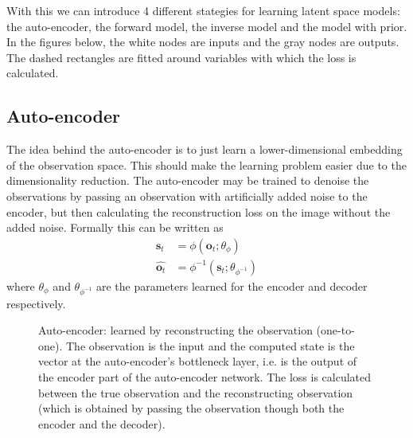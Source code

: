 With this we can introduce 4 different stategies for learning latent space models:
the auto-encoder, the forward model, the inverse model and the model
with prior.
In the figures below, the white nodes are inputs and the gray nodes are outputs.
The dashed rectangles are fitted around variables with which the loss is calculated.

\subsection{Auto-encoder}
The idea behind the auto-encoder is to just learn a lower-dimensional embedding
of the observation space. This should make the learning problem easier due to the
dimensionality reduction.
The auto-encoder may be trained to denoise the observations by passing an observation
with artificially added noise to the encoder, but then calculating the reconstruction
loss on the image without the added noise.
Formally this can be written as
\begin{align}
		\bm{s}_{t} &= \phi (\bm{o}_{t}; \theta_{ \phi }) \\
		\hat{\bm{o}_{t}} &= \phi^{ -1 } (\bm{s}_{t}; \theta_{ \phi^{ -1 } })
\end{align}
where $ \theta_{ \phi }  $ and
$ \theta_{ \phi^{ -1 } }  $ are the parameters learned for the encoder and decoder respectively.

\begin{figure}[htpb]
\begin{center}
\end{center}
		\caption{Auto-encoder: learned by reconstructing the observation (one-to-one).
				The observation is the input and the computed state is the vector at
				the auto-encoder's bottleneck layer, i.e. is the output of the encoder
				part of the auto-encoder network.
		The loss is calculated between the true observation and the reconstructing observation (which
		is obtained by passing the observation though both the encoder and the decoder).}
\end{figure}

